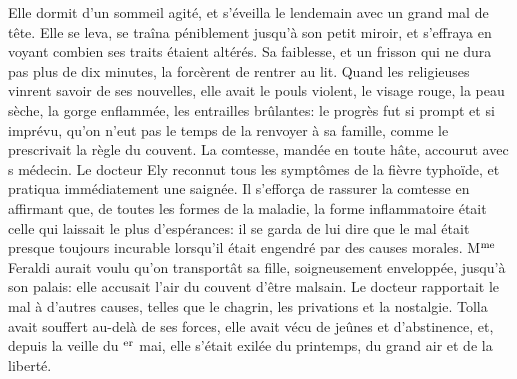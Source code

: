 Elle dormit d'un sommeil agité, et s'éveilla le lendemain avec un grand mal de tête. Elle se leva, se traîna péniblement jusqu'à son petit miroir, et s'effraya en voyant combien ses traits étaient altérés. Sa faiblesse, et un frisson qui ne dura pas plus de dix minutes, la forcèrent de rentrer au lit. Quand les religieuses vinrent savoir de ses nouvelles, elle avait le pouls violent, le visage rouge, la peau sèche, la gorge enflammée, les entrailles brûlantes: le progrès fut si prompt et si imprévu, qu'on n'eut pas le temps de la renvoyer à sa famille, comme le prescrivait la règle du couvent. La comtesse, mandée en toute hâte, accourut avec s médecin. Le docteur Ely reconnut tous les symptômes de la fièvre typhoïde, et pratiqua immédiatement une saignée. Il s'efforça de rassurer la comtesse en affirmant que, de toutes les formes de la maladie, la forme inflammatoire était celle qui laissait le plus d'espérances: il se garda de lui dire que le mal était presque toujours incurable lorsqu'il était engendré par des causes morales. M$\textsuperscript{me}$ Feraldi aurait voulu qu'on transportât sa fille, soigneusement enveloppée, jusqu'à son palais: elle accusait l'air du couvent d'être malsain. Le docteur rapportait le mal à d'autres causes, telles que le chagrin, les privations et la nostalgie. Tolla avait souffert au-delà de ses forces, elle avait vécu de jeûnes et d'abstinence, et, depuis la veille du $\textsuperscript{er}$ mai, elle s'était exilée du printemps, du grand air et de la liberté.


